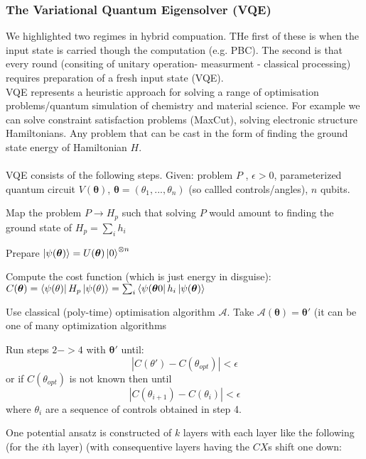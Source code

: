 \documentclass{article}
\begin{document}
\subsubsection{The Variational Quantum Eigensolver (VQE)}
We highlighted two regimes in hybrid compuation. THe first of these is when the input state is carried though the computation (e.g. PBC). The second is that every round (consiting of unitary operation- measurment - classical processing) requires preparation of a fresh input state (VQE).\\
VQE represents a heuristic approach for solving a range of optimisation problems/quantum simulation of chemistry and material science. For example we can solve constraint satisfaction problems (MaxCut), solving electronic structure Hamiltonians. Any problem that can be cast in the form of finding the ground state energy of Hamiltonian $H$.\\\\
VQE consists of the following steps. Given: problem $P$ , $\epsilon >0$, parameterized quantum circuit $V(\bm \theta)$, $\bm \theta = ( \theta_1, ..., \theta_n)$ (so callled controls/angles), $n$ qubits.
\begin{romanlist}
\item Map the problem $P \rightarrow H_p$ such that solving $P$ would amount to finding the ground state of $H_p = \sum_i h_i$\\
\item Prepare $\ket{\psi(\bm \theta)} = U(\bm \theta) \ket{0}^{\otimes n}$\\
\item Compute the cost function (which is just energy in disguise): $C(\bm \theta) = \bra{\psi(\theta)}H_p \ket{\psi(\theta)} = \sum_i \bra{\psi(\bm \theta0} h_i \ket{\psi(\bm \theta)}$\\
\item Use classical (poly-time) optimisation algorithm $\mathcal{A}$. Take $\mathcal{A}(\bm \theta) = \bm \theta'$ (it can be one of many optimization algorithms\\
\item Run steps $2 ->4$ with $\bm \theta'$ until:
        $$
        |C(\theta') - C(\theta_{opt}) | < \epsilon
        $$
        or if $C(\theta_{opt})$ is not known then until 
        $$
        |C(\theta_{i+1}) - C(\theta_i)| < \epsilon
        $$
        where $\theta_i$ are a sequence of controls obtained in step 4.
\end{romanlist}
One potential ansatz is constructed of $k$ layers with each layer like the following (for the $i$th layer) (with consequentive layers having the $CX$s shift one down:
\end{document}
